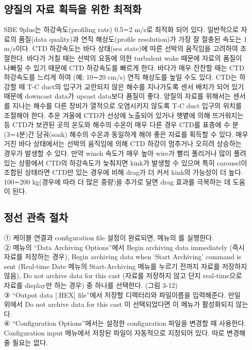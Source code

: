 \documentclass[
]{book}
\begin{document}
\hypertarget{uxc591uxc9c8uxc758-uxc790uxb8cc-uxd68duxb4dduxc744-uxc704uxd55c-uxcd5cuxc801uxd654}{%
\subsection{양질의 자료 획득을 위한 최적화}\label{uxc591uxc9c8uxc758-uxc790uxb8cc-uxd68duxb4dduxc744-uxc704uxd55c-uxcd5cuxc801uxd654}}

SBE 9plus는 하강속도(profiling rate) 0.5∼2 m/s로 최적화 되어 있다. 일반적으로 자료의 품질(data quality)과 연직 해상도(profile resolution)가 가장 잘 절충된 속도는 1 m/s이다. CTD 하강속도는 바다 상태(sea state)에 따른 선박의 움직임을 고려하여 조절한다. 바다가 거칠 때는 선박의 요동에 의한 turbulent wake 때문에 자료의 품질이 나빠질 수 있기 때문에 CTD 하강속도를 빠르게 한다. 바다가 매우 잔잔할 때는 CTD 하강속도를 느리게 하여 (예; 10∼20 cm/s) 연직 해상도를 높일 수도 있다.
CTD는 하강할 때 T-C duct의 입구가 교란되지 않은 해수를 지나가도록 센서 배치가 되어 있기 때문에 downcast data가 upcast data보다 품질이 좋다. 양질의 자료를 위해서는 센서를 지나는 해수를 다른 장비가 열적으로 오염시키지 않도록 T-C duct 입구의 위치를 조절해야 한다.
추운 겨울에 CTD가 선상에 노출되어 있거나 햇볕에 의해 뜨거워지는 등 CTD가 보관된 곳의 온도와 해수의 수온이 매우 다른 경우 CTD를 표층에 수 분(3∼4분)간 담궈(soak) 해수의 수온과 동일하게 해야 좋은 자료를 획득할 수 있다.
매우 거친 바다 상태에서는 선박의 움직임에 의해 CTD 하강이 멈추거나 오히려 상승하는 경우가 발생할 수 있다. 만약 winch 속도가 매우 높아 wire가 빨리 풀리거나 많이 풀려 있는 상황에서 CTD의 하강속도가 늦춰지면 kink가 발생할 수 있으며 특히 carousel이 조합된 상태라면 CTD만 있는 경우에 비해 drag가 더 커서 kink의 가능성이 더 높다. 100∼200 kg(경우에 따라 더 많은 중량)을 추가로 달면 drag 효과를 극복하는 데 도움이 된다.

\hypertarget{uxc815uxc120-uxad00uxce21-uxc808uxcc28}{%
\subsection{정선 관측 절차}\label{uxc815uxc120-uxad00uxce21-uxc808uxcc28}}

① 케이블 연결과 configuration file 설정이 완료되면, 메뉴의 를 실행한다.\\
② 메뉴의 ``Data Archiving Options''에서 Begin archiving data immediately (즉시 자료를 저장하는 경우), Begin archiving data when `Start Archiving' command is sent (Real-time Date 메뉴의 Start-Archiving 메뉴를 누르기 전까지 자료를 저장하지 않음), Do not archive data for this cast (자료를 저장하지 않고 단지 real-time으로 자료를 display만 하는 경우) 중 하나를 선택한다. (그림 3-12)\\
③ ``Output data {[}.HEX{]} file''에서 저장할 디렉터리와 파일이름을 입력해준다. 만일 위에서 Do not archive data for this cast 이 선택되었다면 이 메뉴가 활성화되지 않는다.\\
④ ``Configuration Options''에서는 설정한 configuration 파일을 변경할 때 사용한다. Configuration input 메뉴에서 저장된 파일이 자동적으로 지정되어 있다. 따로 변경해줄 필요는 없다.
\end{document}
